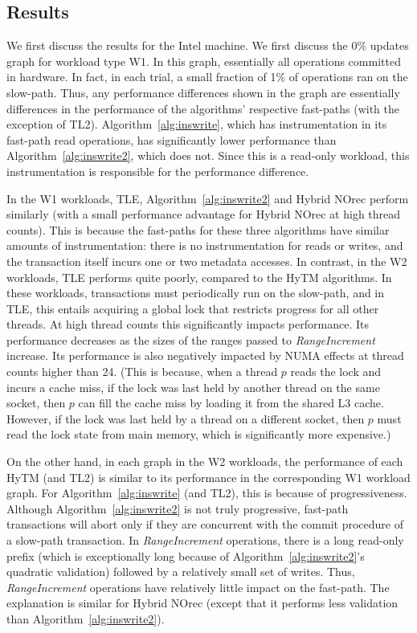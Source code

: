 \subsection{Results}
We first discuss the results for the Intel machine.
We first discuss the 0\% updates graph for workload type W1.
In this graph, essentially all operations committed in hardware.
In fact, in each trial, a small fraction of 1\% of operations ran on the slow-path.
Thus, any performance differences shown in the graph are essentially differences in the performance of the algorithms' respective fast-paths (with the exception of TL2).
Algorithm~\ref{alg:inswrite}, which has instrumentation in its fast-path read operations, has significantly lower performance than Algorithm~\ref{alg:inswrite2}, which does not.
Since this is a read-only workload, this instrumentation is responsible for the performance difference.

In the W1 workloads, TLE, Algorithm~\ref{alg:inswrite2} and Hybrid NOrec perform similarly (with a small performance advantage for Hybrid NOrec at high thread counts).
This is because the fast-paths for these three algorithms have similar amounts of instrumentation: there is no instrumentation for reads or writes, 
and the transaction itself incurs one or two metadata accesses.
In contrast, in the W2 workloads, TLE performs quite poorly, compared to the HyTM algorithms.
In these workloads, transactions must periodically run on the slow-path, and in TLE, 
this entails acquiring a global lock that restricts progress for all other threads.
At high thread counts this significantly impacts performance.
Its performance decreases as the sizes of the ranges passed to \textit{RangeIncrement} increase.
Its performance is also negatively impacted by NUMA effects at thread counts higher than 24.
(This is because, when a thread $p$ reads the lock and incurs a cache miss, 
if the lock was last held by another thread on the same socket, 
then $p$ can fill the cache miss by loading it from the shared L3 cache.
However, if the lock was last held by a thread on a different socket, 
then $p$ must read the lock state from main memory, which is significantly more expensive.)

On the other hand, in each graph in the W2 workloads, the performance of each HyTM (and TL2) is similar to its performance in the corresponding W1 workload graph.
For Algorithm~\ref{alg:inswrite} (and TL2), this is because of progressiveness.
Although Algorithm~\ref{alg:inswrite2} is not truly progressive, fast-path transactions will abort only if they are concurrent with the commit procedure of a slow-path transaction.
In \textit{RangeIncrement} operations, there is a long read-only prefix (which is exceptionally long because of Algorithm~\ref{alg:inswrite2}'s quadratic validation) followed by a relatively small set of writes.
Thus, \textit{RangeIncrement} operations have relatively little impact on the fast-path.
The explanation is similar for Hybrid NOrec (except that it performs less validation than Algorithm~\ref{alg:inswrite2}).


